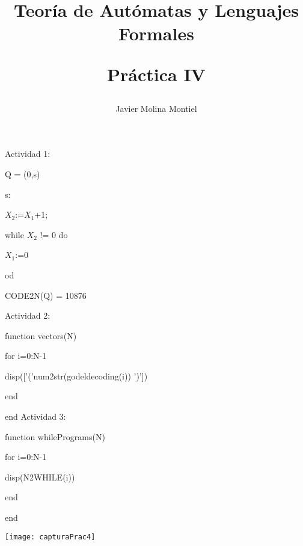 \documentclass{article}
\title{\Large \bf Teoría de Autómatas y Lenguajes Formales

\LARGE \rm Práctica IV}
\author{Javier Molina Montiel}
\begin{document}
\maketitle
\justify\normalsize
Actividad 1:

Q = (0,s)

s:

\quad $X_2$:=$X_1$+1;

\quad while $X_2$ != 0 do

\quad\quad $X_1$:=0

\quad od

CODE2N(Q) = 10876

\justify\normalsize
Actividad 2:

function vectors(N)

for i=0:N-1

disp(['('num2str(godeldecoding(i)) ')'])

end

end
\justify\normalsize
Actividad 3:

function whilePrograms(N)

for i=0:N-1

disp(N2WHILE(i))

end

end

\begin{flushleft}
\texttt{[image: capturaPrac4]}
\end{flushleft}
\end{document}
